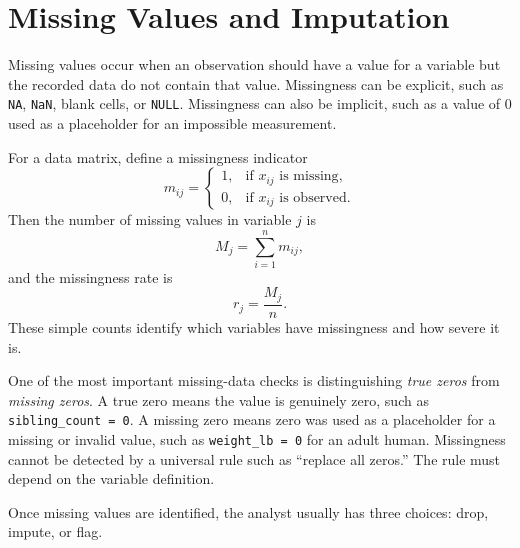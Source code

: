 {\section{Missing Values and Imputation}

Missing values occur when an observation should have a value for a variable but the recorded data do not contain that value.  Missingness can be explicit, such as \texttt{NA}, \texttt{NaN}, blank cells, or \texttt{NULL}.  Missingness can also be implicit, such as a value of 0 used as a placeholder for an impossible measurement.

For a data matrix, define a missingness indicator
\begin{equation}
  m_{ij}=\begin{cases}
    1, & \text{if } x_{ij} \text{ is missing},\\
    0, & \text{if } x_{ij} \text{ is observed}.
  \end{cases}
  \label{eq:ch3-missing-indicator}
\end{equation}
Then the number of missing values in variable $j$ is
\begin{equation}
  M_j=\sum_{i=1}^n m_{ij},
  \label{eq:ch3-missing-count-column}
\end{equation}
and the missingness rate is
\begin{equation}
  r_j=\frac{M_j}{n}.
  \label{eq:ch3-missing-rate-column}
\end{equation}
These simple counts identify which variables have missingness and how severe it is.

One of the most important missing-data checks is distinguishing \emph{true zeros} from \emph{missing zeros}.  A true zero means the value is genuinely zero, such as \texttt{sibling\_count = 0}.  A missing zero means zero was used as a placeholder for a missing or invalid value, such as \texttt{weight\_lb = 0} for an adult human.  Missingness cannot be detected by a universal rule such as ``replace all zeros.''  The rule must depend on the variable definition.

Once missing values are identified, the analyst usually has three choices: drop, impute, or flag.

}
